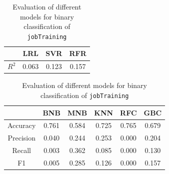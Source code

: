 \documentclass{article} %
\begin{document}
\begin{table}[H]
  \begin{minipage}{0.30\textwidth}
    \centering
    \begin{tabular}{| c | c | c | c |}
      \hline
      ~ & LRL & SVR & RFR \\ \hline
      $R^2$ & 0.063 & 0.123 & 0.157 \\
      \hline
    \end{tabular}
    \caption{Evaluation of different models for continuous regression of \texttt{gpa}}
    \label{tab:contresults}
  \end{minipage}%
  \hfill
  \begin{minipage}{0.60\textwidth}
    \centering
    \begin{tabular}{| c | c | c | c | c | c |}
      \hline
      ~ & BNB & MNB & KNN & RFC & GBC \\ \hline
      Accuracy & 0.761 & 0.584 & 0.725 & 0.765 & 0.679 \\
      Precision & 0.040 & 0.244 & 0.253 & 0.000 & 0.204 \\
      Recall & 0.003 & 0.362 & 0.085 & 0.000 & 0.130 \\
      F1 & 0.005 & 0.285 & 0.126 & 0.000 & 0.157 \\
      \hline
    \end{tabular}
    \caption{Evaluation of different models for binary classification of \texttt{jobTraining}}
    \label{tab:boolresults}
  \end{minipage}
\end{table}


\end{document}
